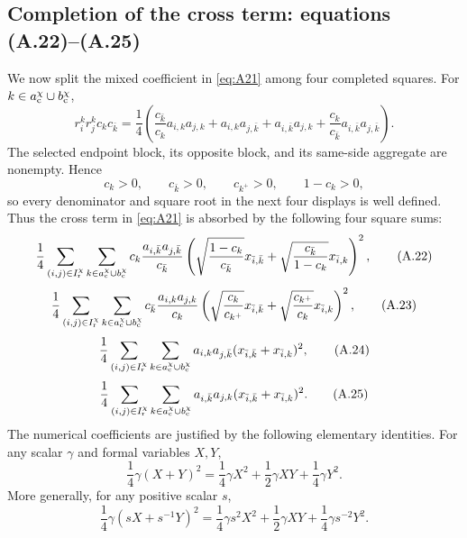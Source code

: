 \documentclass[11pt]{article}
\begin{document}
\subsection{Completion of the cross term: equations (A.22)--(A.25)}

We now split the mixed coefficient in \eqref{eq:A21} among four completed
squares.
For $k\in a_{\rm c}^\chi\cup b_{\rm c}^\chi$,
\begin{equation}\label{eq:rikrjk}
 r_i^kr_j^kc_kc_{\bar k}
=\frac14\left(\frac{c_{\bar k}}{c_k}a_{i,k}a_{j,k}+a_{i,k}a_{j,\bar k}+a_{i,\bar k}a_{j,k}+\frac{c_k}{c_{\bar k}}a_{i,\bar k}a_{j,\bar k}\right).
\tag{A.21a}
\end{equation}
The selected endpoint block, its opposite block, and its same-side aggregate
are nonempty.  Hence
\[
c_k>0,\qquad c_{\bar k}>0,\qquad c_{k^+}>0,\qquad 1-c_k>0,
\]
so every denominator and square root in the next four displays is well
defined.
Thus the cross term in \eqref{eq:A21} is absorbed by the following four square sums:
\begin{equation}\label{eq:A22}
\frac14\sum_{(i,j)\in I_{\rm r}^\chi}
\sum_{k\in a_{\rm c}^\chi\cup b_{\rm c}^\chi}
 c_k\frac{a_{i,\bar k}a_{j,\bar k}}{c_{\bar k}}
\left(\sqrt{\frac{1-c_k}{c_{\bar k}}}x_{\bar i,\bar k}+\sqrt{\frac{c_{\bar k}}{1-c_k}}x_{\bar i,k}\right)^2,
\tag{A.22}
\end{equation}
\begin{equation}\label{eq:A23}
\frac14\sum_{(i,j)\in I_{\rm r}^\chi}
\sum_{k\in a_{\rm c}^\chi\cup b_{\rm c}^\chi}
 c_{\bar k}\frac{a_{i,k}a_{j,k}}{c_k}
\left(\sqrt{\frac{c_k}{c_{k^+}}}x_{\bar i,\bar k}+\sqrt{\frac{c_{k^+}}{c_k}}x_{\bar i,k}\right)^2,
\tag{A.23}
\end{equation}
\begin{equation}\label{eq:A24}
\frac14\sum_{(i,j)\in I_{\rm r}^\chi}
\sum_{k\in a_{\rm c}^\chi\cup b_{\rm c}^\chi}
 a_{i,k}a_{j,\bar k}(x_{\bar i,\bar k}+x_{\bar i,k})^2,
\tag{A.24}
\end{equation}
\begin{equation}\label{eq:A25}
\frac14\sum_{(i,j)\in I_{\rm r}^\chi}
\sum_{k\in a_{\rm c}^\chi\cup b_{\rm c}^\chi}
 a_{i,\bar k}a_{j,k}(x_{\bar i,\bar k}+x_{\bar i,k})^2.
\tag{A.25}
\end{equation}
The numerical coefficients are justified by the following elementary
identities.  For any scalar $\gamma$ and formal variables $X,Y$,
\[
\frac14\gamma(X+Y)^2
=\frac14\gamma X^2+\frac12\gamma XY+\frac14\gamma Y^2.
\]
More generally, for any positive scalar $s$,
\[
\frac14\gamma(sX+s^{-1}Y)^2
=
\frac14\gamma s^2X^2+\frac12\gamma XY
+\frac14\gamma s^{-2}Y^2.
\]
\end{document}
